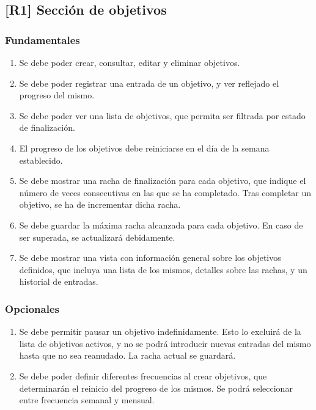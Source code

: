 \documentclass[10pt, a4paper]{aqademic}
\begin{document}
\subsection*{[R1] Sección de objetivos}

\subsubsection*{Fundamentales}

\begin{enumerate}[label=\textbf{R1.\arabic*f}, leftmargin=10mm]
	\item Se debe poder crear, consultar, editar y eliminar objetivos.
	
	\item Se debe poder registrar una entrada de un objetivo, y ver reflejado el progreso del mismo.
	
	\item Se debe poder ver una lista de objetivos, que permita ser filtrada por estado de finalización.
	
	\item El progreso de los objetivos debe reiniciarse en el día de la semana establecido.
	
	\item Se debe mostrar una racha de finalización para cada objetivo, que indique el número de veces consecutivas en las que se ha completado. Tras completar un objetivo, se ha de incrementar dicha racha.
	
	\item Se debe guardar la máxima racha alcanzada para cada objetivo. En caso de ser superada, se actualizará debidamente.
	
	\item Se debe mostrar una vista con información general sobre los objetivos definidos, que incluya una lista de los mismos, detalles sobre las rachas, y un historial de entradas.
\end{enumerate}


\subsubsection*{Opcionales}

\begin{enumerate}[label=\textbf{R1.\arabic*o}, leftmargin=10mm]
	\item Se debe permitir pausar un objetivo indefinidamente. Esto lo excluirá de la lista de objetivos activos, y no se podrá introducir nuevas entradas del mismo hasta que no sea reanudado. La racha actual se guardará.
	
	\item Se debe poder definir diferentes frecuencias al crear objetivos, que determinarán el reinicio del progreso de los mismos. Se podrá seleccionar entre frecuencia semanal y mensual.
\end{enumerate}
\end{document}
